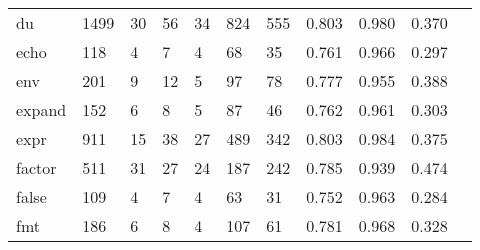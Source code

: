 \begin{longtable}{lp{1.10cm}p{1.10cm}p{1.10cm}p{1.10cm}p{1.10cm}p{1.10cm}p{1.10cm}p{1.10cm}p{1.10cm}p{1.10cm}}
du        &                   1499 &                                 30 &                                56 &                               34 &                               824 &                             555 &                             0.803 &                                 0.980 &                               0.370 \\
echo      &                    118 &                                  4 &                                 7 &                                4 &                                68 &                              35 &                             0.761 &                                 0.966 &                               0.297 \\
env       &                    201 &                                  9 &                                12 &                                5 &                                97 &                              78 &                             0.777 &                                 0.955 &                               0.388 \\
expand    &                    152 &                                  6 &                                 8 &                                5 &                                87 &                              46 &                             0.762 &                                 0.961 &                               0.303 \\
expr      &                    911 &                                 15 &                                38 &                               27 &                               489 &                             342 &                             0.803 &                                 0.984 &                               0.375 \\
factor    &                    511 &                                 31 &                                27 &                               24 &                               187 &                             242 &                             0.785 &                                 0.939 &                               0.474 \\
false     &                    109 &                                  4 &                                 7 &                                4 &                                63 &                              31 &                             0.752 &                                 0.963 &                               0.284 \\
fmt       &                    186 &                                  6 &                                 8 &                                4 &                               107 &                              61 &                             0.781 &                                 0.968 &                               0.328 \\

\end{longtable}

